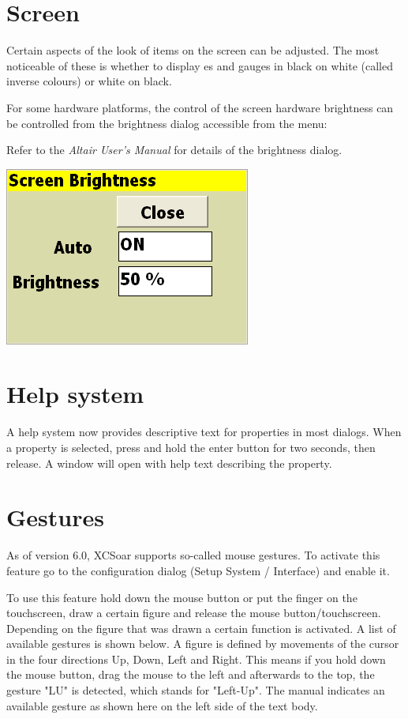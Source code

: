 \section{Screen}

Certain aspects of the look of items on the screen can be adjusted.
The most noticeable of these is whether to display {\InfoBox}es and
gauges in black on white (called inverse colours) or white on black.

For some hardware platforms, the control of the screen hardware 
brightness can be controlled from the brightness dialog
accessible from the menu:
\begin{quote}
\blink{}\blink{}
\end{quote}

Refer to the {\em Altair User's Manual} for details of the brightness
dialog.

\begin{center}
\includegraphics[angle=0,width=0.45\linewidth,keepaspectratio='true']{figures/brightness.png}
\end{center}

\section{Help system}
  A help system now provides descriptive text for properties in
  most dialogs.  When a property is selected, press and hold the
  enter button for two seconds, then release.  A window will open with
  help text describing the property.

\section{Gestures}\label{sec:gestures}
  As of version 6.0, XCSoar supports so-called mouse gestures. To activate 
  this feature go to the configuration dialog (Setup System / Interface) and
  enable it.

  To use this feature hold down the mouse button or put the finger on the 
  touchscreen, draw a certain figure and release the mouse 
  button/touchscreen. Depending on the figure that was drawn 
  a certain function is activated. A list of available gestures is 
  shown below. A figure is defined by movements of the 
  cursor in the four directions Up, Down, Left and Right. This means if 
  you hold down the mouse button, drag the mouse to the left 
  and afterwards to the top,  the gesture "LU" is detected,
  which stands for "Left-Up". The manual indicates an available gesture as shown
  here on the left side of the text body.


